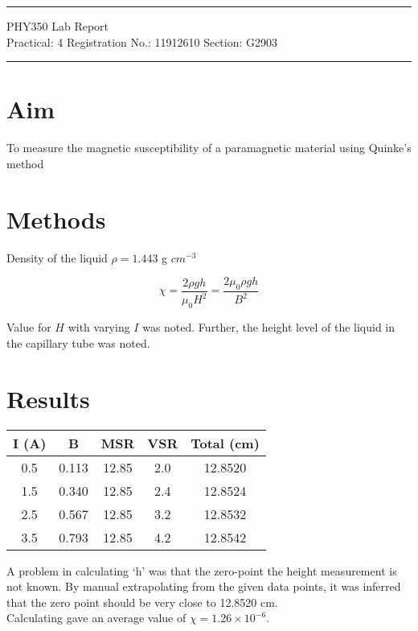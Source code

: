 \documentclass{article}
\begin{document}
	
	\author{Aayush Arya}
	\date{(Submitted: \today)}
	\title{}
	
	\maketitle
	
	\hrule
	\begin{center}
		PHY350 Lab Report\\
		Practical: 4 \quad Registration No.: 11912610 \quad Section: G2903
	\end{center}
	\hrule
	
	\section*{Aim}
	To measure the magnetic susceptibility of a paramagnetic material using Quinke's method
	
	\section*{Methods}
	
	Density of the liquid $\rho = 1.443$ g $cm^{-3}$
	  
	  $$ \chi = \frac{2 \rho g h}{\mu_0 H^2} = \frac{2\mu_0 \rho g h}{B^2}$$
	  
	Value for $H$ with varying $I$ was noted. Further, the height level of the liquid in the capillary tube was noted.
	
	\section*{Results}
	
	\begin{table}[h]
		\centering
		\begin{tabular}{|c|c|c|c|c|}
			\hline
			I (A)  & B & MSR   & VSR & Total (cm)  \\
			\hline
			0.5 & 0.113 & 12.85 & 2.0 & 12.8520 \\
			1.5 & 0.340 & 12.85 & 2.4 & 12.8524 \\
			2.5 & 0.567 & 12.85 & 3.2 & 12.8532 \\
			3.5 & 0.793 & 12.85 & 4.2 & 12.8542\\
			\hline
		\end{tabular}
	\end{table}

	A problem in calculating `h' was that the zero-point the height measurement is not known. By manual extrapolating from the given data points, it was inferred that the zero point should be very close to 12.8520 cm.\\
	
	Calculating gave an average value of $\chi = 1.26\times 10^{-6}$.
	
\end{document}
